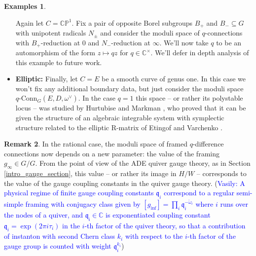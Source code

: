 \documentclass[11pt, oneside, reqno]{amsart}
\theoremstyle{definition} \newtheorem{definition}{Definition}[section]
\theoremstyle{definition} \newtheorem{remark}[definition]{Remark}
\theoremstyle{definition} \newtheorem{remarks}[definition]{Remarks}
\theoremstyle{definition} \newtheorem{question}[definition]{Question}
\theoremstyle{definition} \newtheorem*{note}{Note}
\theoremstyle{definition} \newtheorem{example}[definition]{Example}
\theoremstyle{definition} \newtheorem{examples}[definition]{Examples}
\newcommand{\bb}[1]{\mathbb{#1}}
\newcommand{\CC}{\mathbb{C}}
\newcommand{\sub}{\subseteq}
\newcommand{\qconn}{q\text{-Conn}}
\newcommand{\vasily}[1]{(\textcolor{blue}{Vasily: #1})}
\begin{document}
\begin{examples}
\begin{itemize}
  Again let $C = \bb{CP}^1$.  Fix a pair of opposite Borel subgroups $B_+$ and $B_- \sub G$ with unipotent radicals $N_\pm$ and consider the moduli space of $q$-connections with $B_+$-reduction at $0$ and $N_-$-reduction at $\infty$.  We'll now take $q$ to be an automorphism of the form $z \mapsto qz$ for $q \in \CC^\times$.  We'll defer in depth analysis of this example to future work.
  
  \item \textbf{Elliptic:} Finally, let $C = E$ be a smooth curve of genus one.  In this case we won't fix any additional boundary data, but just consider the moduli space $\qconn_G(E,D, \omega^\vee)$.  In the case $q = 1$ this space -- or rather its polystable locus -- was studied by Hurtubise and Markman \cite{HurtubiseMarkman}, who proved that it can be given the structure of an algebraic integrable system with symplectic structure related to the elliptic R-matrix of Etingof and Varchenko \cite{EtingofVarchenko}.
 \end{itemize}
\end{examples}

\begin{remark}
In the rational case, the moduli space of framed $q$-difference connections now depends on a new parameter: the value of the framing $g_\infty \in G/G$.  From the point of view of the ADE quiver gauge theory, as in Section \ref{intro_gauge_section}, this value -- or rather its image in $H/W$ -- corresponds to the value of the gauge coupling constants in the quiver gauge theory.
\vasily{A physical regime of finite gauge coupling constants $\mathfrak{q}_i$
  correspond to a regular semi-simple framing
  with conjugacy class given by $[g_{\inf}]  = \prod_{i} \mathfrak{q}_{i}^{-\check \omega_i}$ where $i$ runs over the nodes of a quiver, and $\mathfrak{q_i} \in \mathbb{C}$ is exponentiated coupling constant $\mathfrak{q}_{i} = \exp (2 \pi i \tau_i)$ in the $i$-th factor of the quiver theory, so that a contribution
  of instanton
  with second Chern class $k_i$ with respect to the $i$-th
  factor of the gauge group is counted with weight $\mathfrak{q}_{i}^{k_i}$}
\end{remark}
\end{document}
